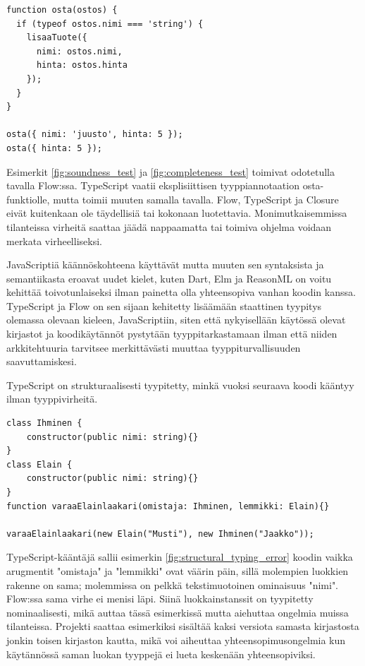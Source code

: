 \begin{minipage}{\linewidth}
\begin{lstlisting}[caption={Toimiva JavaScript-ohjelma: Virheelliseltä kutsulta on suojauduttu tarkistuksella.}]
function osta(ostos) {
  if (typeof ostos.nimi === 'string') {
    lisaaTuote({
      nimi: ostos.nimi,
      hinta: ostos.hinta
    });
  }
}

osta({ nimi: 'juusto', hinta: 5 });
osta({ hinta: 5 });
\end{lstlisting}
\label{fig:completeness_test}
\end{minipage}
Esimerkit \ref{fig:soundness_test} ja \ref{fig:completeness_test} toimivat
odotetulla tavalla Flow:ssa. TypeScript vaatii eksplisiittisen tyyppiannotaation
osta-funktiolle, mutta toimii muuten samalla tavalla. Flow, TypeScript ja
Closure eivät kuitenkaan ole täydellisiä tai kokonaan luotettavia.
Monimutkaisemmissa tilanteissa virheitä saattaa jäädä nappaamatta tai toimiva
ohjelma voidaan merkata virheelliseksi.

JavaScriptiä käännöskohteena käyttävät
mutta muuten sen syntaksista ja semantiikasta eroavat uudet kielet,
kuten Dart, Elm ja ReasonML on voitu kehittää toivotunlaiseksi ilman painetta olla
yhteensopiva vanhan koodin kanssa. TypeScript ja Flow on sen sijaan kehitetty
lisäämään staattinen tyypitys olemassa olevaan kieleen, JavaScriptiin,
siten että nykyisellään käytössä olevat kirjastot ja koodikäytännöt pystytään
tyyppitarkastamaan ilman että niiden arkkitehtuuria tarvitsee merkittävästi
muuttaa tyyppiturvallisuuden saavuttamiskesi.

TypeScript on strukturaalisesti tyypitetty, minkä vuoksi seuraava koodi kääntyy
ilman tyyppivirheitä.

\begin{minipage}{\linewidth}
\begin{lstlisting}[caption={Loogisen virheen sisältävä, mutta ilman virheitä kääntyvä TypeScript-ohjelma.}]
class Ihminen {
    constructor(public nimi: string){}
}
class Elain {
    constructor(public nimi: string){}
}
function varaaElainlaakari(omistaja: Ihminen, lemmikki: Elain){}

varaaElainlaakari(new Elain("Musti"), new Ihminen("Jaakko"));
\end{lstlisting}
\label{fig:structural_typing_error}
\end{minipage}
TypeScript-kääntäjä sallii esimerkin \ref{fig:structural_typing_error} koodin
vaikka arugmentit "omistaja" ja "lemmikki" ovat väärin päin, sillä
molempien luokkien rakenne on sama; molemmissa on pelkkä tekstimuotoinen
ominaisuus "nimi". Flow:ssa sama virhe ei menisi läpi. Siinä luokkainstanssit
on tyypitetty nominaalisesti, mikä auttaa tässä esimerkissä mutta aiehuttaa ongelmia
muissa tilanteissa. Projekti saattaa esimerkiksi sisältää kaksi versiota samasta
kirjastosta jonkin toisen kirjaston kautta, mikä voi aiheuttaa yhteensopimusongelmia
kun käytännössä saman luokan tyyppejä ei lueta keskenään yhteensopiviksi. 